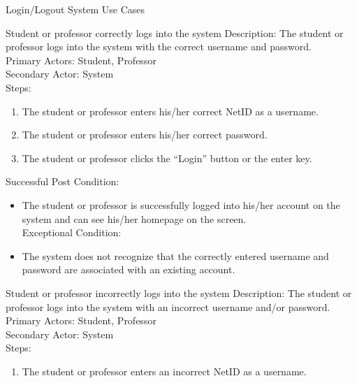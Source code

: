 \documentclass{article}
\begin{document}
\begin{section}{Login/Logout System Use Cases}
    \begin{subsection}{Student or professor correctly logs into the system}
        Description: The student or professor logs into the system with the correct username and password.\\
        Primary Actors: Student, Professor\\
        Secondary Actor: System\\
        Steps:
        \begin{enumerate}
            \item The student or professor enters his/her correct NetID as a username.
            \item The student or professor enters his/her correct password.
            \item The student or professor clicks the “Login” button or the enter key.
        \end{enumerate}
        Successful Post Condition:\\
        \begin{itemize}
        \item The student or professor is successfully logged into his/her account on the system and can see his/her homepage on the screen.\\
        Exceptional Condition:
        \item The system does not recognize that the correctly entered username and password are associated with an existing account.
        \end{itemize}
        \end{subsection}
        \begin{subsection}{Student or professor incorrectly logs into the system}
    Description: The student or professor logs into the system with an incorrect username and/or password.\\
    Primary Actors: Student, Professor\\
    Secondary Actor: System\\
    Steps:
        \begin{enumerate}
            \item The student or professor enters an incorrect NetID as a username.

\end{enumerate}
\end{subsection}
\end{section}
\end{document}
